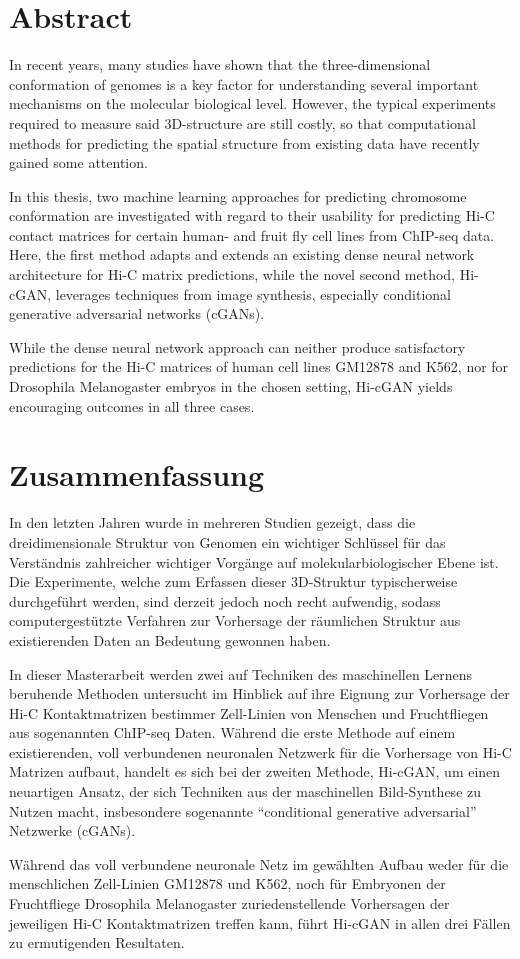 \section*{Abstract}

In recent years, many studies have shown that the three-dimensional conformation of genomes is a key factor
for understanding several important mechanisms on the molecular biological level.
However, the typical experiments required to measure said 3D-structure are still costly,
so that computational methods for predicting the spatial structure from existing data have recently gained some attention. 

In this thesis, two machine learning approaches for predicting chromosome conformation are investigated with 
regard to their usability for predicting Hi-C contact matrices for certain human- and fruit fly cell lines
from ChIP-seq data.
Here, the first method adapts and extends an existing dense neural network architecture for Hi-C matrix predictions, 
while the novel second method, Hi-cGAN, leverages techniques from image synthesis, especially conditional generative adversarial networks (cGANs).

While the dense neural network approach can neither produce satisfactory predictions for the Hi-C matrices of human cell lines GM12878 and K562,
nor for Drosophila Melanogaster embryos in the chosen setting, Hi-cGAN yields encouraging outcomes in all three cases.


\section*{Zusammenfassung}

In den letzten Jahren wurde in mehreren Studien gezeigt, dass die dreidimensionale Struktur von Genomen ein
wichtiger Schlüssel für das Verständnis zahlreicher wichtiger Vorgänge auf molekularbiologischer Ebene ist.
Die Experimente, welche zum Erfassen dieser 3D-Struktur typischerweise durchgeführt werden,
sind derzeit jedoch noch recht aufwendig, sodass computergestützte Verfahren zur Vorhersage 
der räumlichen Struktur aus existierenden Daten an Bedeutung gewonnen haben.

In dieser Masterarbeit werden zwei auf Techniken des maschinellen Lernens beruhende Methoden untersucht
im Hinblick auf ihre Eignung zur Vorhersage der Hi-C Kontaktmatrizen bestimmer Zell-Linien von Menschen und Fruchtfliegen aus sogenannten ChIP-seq Daten.
Während die erste Methode auf einem existierenden, voll verbundenen neuronalen Netzwerk für die Vorhersage von Hi-C Matrizen aufbaut,
handelt es sich bei der zweiten Methode, Hi-cGAN, um einen neuartigen Ansatz, der sich Techniken aus der maschinellen Bild-Synthese zu Nutzen macht,
insbesondere sogenannte ``conditional generative adversarial'' Netzwerke (cGANs).

Während das voll verbundene neuronale Netz im gewählten Aufbau weder für die menschlichen Zell-Linien GM12878 und K562, 
noch für Embryonen der Fruchtfliege Drosophila Melanogaster zuriedenstellende Vorhersagen der jeweiligen Hi-C Kontaktmatrizen treffen kann, 
führt Hi-cGAN in allen drei Fällen zu ermutigenden Resultaten.
